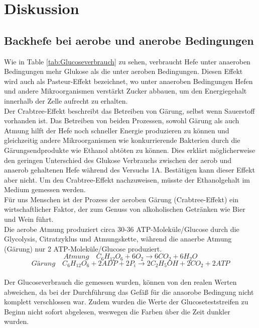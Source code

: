 \documentclass[10pt,a4paper]{article}
\begin{document}
	\section{Diskussion}
	\subsection{Backhefe bei aerobe und anerobe Bedingungen}
		Wie in Table \ref{tab:Glucoseverbrauch} zu sehen, verbraucht Hefe unter anaeroben Bedingungen mehr Glukose als die unter aeroben Bedingungen. Diesen Effekt wird auch als Pasteur-Effekt bezeichnet, wo unter anaeroben Bedingungen Hefen und andere Mikroorganismen verstärkt Zucker abbauen, um den Energiegehalt innerhalb der Zelle aufrecht zu erhalten. \\
		Der Crabtree-Effekt beschreibt das Betreiben von Gärung, selbst wenn Sauerstoff vorhanden ist. Das Betreiben von beiden Prozessen, sowohl Gärung als auch Atmung hilft der Hefe noch schneller Energie produzieren zu können und gleichzeitig andere Mikroorganismen wie konkurrierende Bakterien durch die Gärungsendprodukte wie Ethanol abtöten zu können. Dies erklärt möglicherweise den geringen Unterschied des Glukose Verbrauchs zwischen der aerob und anaerob gehaltenen Hefe während des Versuchs 1A. Bestätigen kann dieser Effekt aber nicht. Um den Crabtree-Effekt nachzuweisen, müsste der Ethanolgehalt im Medium gemessen werden.\\
		Für uns Menschen ist der Prozess der aeroben Gärung (Crabtree-Effekt) ein wirtschaftlicher Faktor, der zum Genuss von alkoholischen Getränken wie Bier und Wein führt.\\
		Die aerobe Atmung produziert circa 30-36 ATP-Moleküle/Glucose durch die Glycolysis, Citratzyklus und Atmungskette, während die anaerbe Atmung (Gärung) nur 2 ATP-Moleküle/Glucose produziert.\\
		
		\begin{equation}\nonumber
			Atmung \quad C_6H_{12}O_6 + 6 O_2 \rightarrow 6 CO_2 + 6 H_2O
		\end{equation}
		\begin{equation}\nonumber
			Gärung \quad C_6H_{12}O_6 + 2 ADP + 2P_i \rightarrow 2 C_2H_5OH + 2 CO_2 + 2 ATP
		\end{equation}
	\\
		Der Glucoseverbrauch die gemessen wurden, können von den realen Werten abweichen, da bei der Durchführung das Gefäß für die anaorobe Bedingung nicht komplett verschlossen war. Zudem wurden die Werte der Glucoseteststreifen zu Beginn nicht sofort abgelesen, weswegen die Farben über die Zeit dunkler wurden.
		
\end{document}
